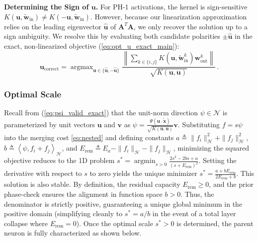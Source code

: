 \documentclass[11pt, a4paper, copyright, gdm]{google}
\newcommand{\norm}[1]{\left\lVert#1\right\rVert}
\newcommand{\inner}[2]{\left\langle#1, #2\right\rangle}
\newcommand{\uVect}{\boldsymbol{u}}
\newcommand{\vVect}{\boldsymbol{v}}
\newcommand{\wVect}{\boldsymbol{w}}
\newcommand{\xVect}{\boldsymbol{x}}
\newcommand{\calH}{\mathcal{H}}
\newcommand{\calN}{\mathcal{N}}
\newcommand{\Amat}{\boldsymbol{A}}
\DeclareMathOperator{\argmin}{argmin}
\DeclareMathOperator{\argmax}{argmax}
\theoremstyle{definition}
\begin{document}
\noindent\textbf{Determining the Sign of $\uVect$.} For PH-1 activations, the kernel is sign-sensitive $K(\uVect, \tilde{\wVect}_{\text{in}}) \neq K(-\uVect, \tilde{\wVect}_{\text{in}})$. However, because our linearization approximation relies on the leading eigenvector $\widehat{\uVect}$ of $\Amat^T \Amat$, we only recover the solution up to a sign ambiguity. We resolve this by evaluating both candidate polarities $\pm\widehat{\uVect}$ in the exact, non-linearized objective (\ref{eq:opt_u_exact_main}):
\begin{equation}
\uVect_{\text{correct}} = \argmax_{\uVect \in \{\widehat{\uVect},-\widehat{\uVect}\}} \frac{\norm{\sum_{k \in \{i,j\}} K(\uVect, \tilde{\wVect}^k_{\text{in}}) \wVect^k_{\text{out}}}}{\sqrt{K(\uVect,\uVect)}} \,.
\end{equation}

\subsubsection{Optimal Scale}
Recall from (\ref{eq:psi_valid_exact})
that the unit-norm direction $\psi \in \calN$ is parameterized by unit vectors $\uVect$ and $\vVect$ as $\psi = \frac{\Psi(\uVect \cdot \tilde{\xVect})}{\sqrt{K(\uVect,\uVect)}} \vVect$. Substituting $f = s\psi$ into the merging cost \eqref{eq:nested} and defining constants $a \triangleq \|f_i\|_{\calH}^2 + \|f_j\|_{\calH}^2$, $b \triangleq \inner{\psi}{f_i+f_j}_{\calH}$, and $E_{\text{rem}} \triangleq E_a - \|f_i\|_{\calH} - \|f_j\|_{\calH}$, minimizing the squared objective reduces to the 1D problem $s^* = \argmin_{s > 0} \frac{2s^2 - 2bs + a}{(s+E_{\text{rem}})^2}$. Setting the derivative with respect to $s$ to zero yields the unique minimizer $s^* = \frac{a + b E_{\text{rem}}}{2 E_{\text{rem}} + b}$. This solution is also stable. By definition, the residual capacity $E_{\text{rem}} \ge 0$, and the prior phase-check ensures the alignment in function space $b > 0$. Thus, the denominator is strictly positive, guaranteeing a unique global minimum in the positive domain (simplifying cleanly to $s^* = a/b$ in the event of a total layer collapse where $E_{\text{rem}}=0$). Once the optimal scale $s^*>0$ is determined, the parent neuron is fully characterized as shown below.
\end{document}
